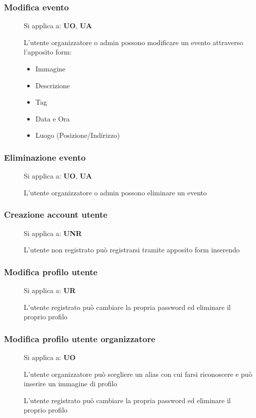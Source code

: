 \documentclass{article}
\begin{document}
\subsubsection{Modifica evento}
\begin{description}
    \item[] Si applica a: \textbf{UO}, \textbf{UA}
    \item[] L'utente organizzatore o admin possono modificare un evento attraverso l'apposito form:
        \begin{itemize}
            \item Immagine
            \item Descrizione
            \item Tag
            \item Data e Ora
            \item Luogo (Posizione/Indirizzo)
        \end{itemize}
\end{description}
\subsubsection{Eliminazione evento}
\begin{description}
    \item[] Si applica a: \textbf{UO}, \textbf{UA}
    \item[] L'utente organizzatore o admin possono eliminare un evento
\end{description}
\subsubsection{Creazione account utente}
\begin{description}
    \item[] Si applica a: \textbf{UNR}
    \item[] L'utente non registrato può registrarsi tramite apposito form inserendo
\end{description}
\subsubsection{Modifica profilo utente}
\begin{description}
    \item[] Si applica a: \textbf{UR}
    \item[] L'utente registrato può cambiare la propria password ed eliminare il proprio profilo
\end{description}
\subsubsection{Modifica profilo utente organizzatore}
\begin{description}
    \item[] Si applica a: \textbf{UO}
    \item[] L'utente organizzatore può scegliere un alias con cui farsi riconoscere e può inserire un immagine di profilo
    \item[] L'utente registrato può cambiare la propria password ed eliminare il proprio profilo
\end{description}
\end{document}
